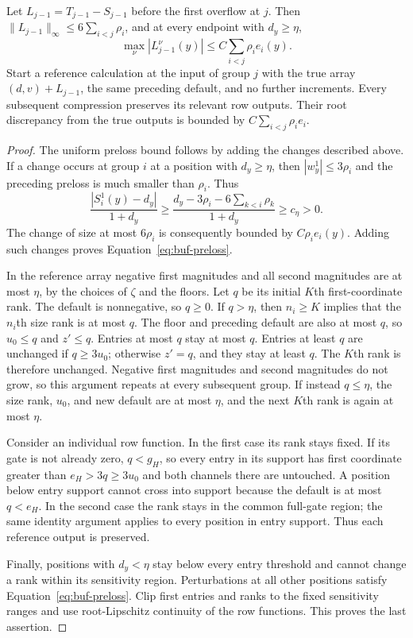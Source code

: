 \begin{lemma}
\label{lem:buf-reference}
Let $L_{j-1}=T_{j-1}-S_{j-1}$ before the first overflow at $j$.
Then $\|L_{j-1}\|_\infty\leq6\sum_{i<j}\rho_i$, and at every endpoint
with $d_y\geq\eta$,
\begin{equation}
 \max_\nu|L_{j-1}^\nu(y)|
       \leq C\sum_{i<j}\rho_i e_i(y).
 \label{eq:buf-preloss}
\end{equation}
Start a reference calculation at the input of group $j$ with the true
array $(d,v)+L_{j-1}$, the same preceding default, and no further
increments.  Every subsequent compression preserves its relevant row
outputs.  Their root discrepancy from the true outputs is bounded by
$C\sum_{i<j}\rho_i e_i$.
\end{lemma}
\begin{proof}
The uniform preloss bound follows by adding the changes described above.
If a change occurs at group $i$ at a position with $d_y\geq\eta$, then
$|w_y^1|\leq3\rho_i$ and the preceding preloss is much smaller than
$\rho_i$.  Thus
\[
 \frac{|S_i^1(y)-d_y|}{1+d_y}
 \geq \frac{d_y-3\rho_i-6\sum_{k<i}\rho_k}{1+d_y}
 \geq c_\eta>0.
\]
The change of size at most $6\rho_i$ is consequently bounded by
$C\rho_i e_i(y)$.  Adding such changes proves
Equation~\eqref{eq:buf-preloss}.

In the reference array negative first magnitudes and all second magnitudes
are at most $\eta$, by the choices of $\zeta$ and the floors.
Let $q$ be its initial $K$th first-coordinate rank.  The default is
nonnegative, so $q\geq0$.  If $q>\eta$, then $n_i\geq K$ implies that the
$n_i$th size rank is at most $q$.  The floor and preceding default are
also at most $q$, so $u_0\leq q$ and $z'\leq q$.  Entries at most $q$
stay at most $q$.  Entries at least $q$ are unchanged if $q\geq3u_0$;
otherwise $z'=q$, and they stay at least $q$.  The $K$th rank is therefore
unchanged.  Negative first magnitudes and second magnitudes do not grow,
so this argument repeats at every subsequent group.  If instead $q\leq\eta$,
the size rank, $u_0$, and new default are at most $\eta$, and the next
$K$th rank is again at most $\eta$.

Consider an individual row function.  In the first case its rank stays
fixed.  If its gate is not already zero, $q<g_H$, so every entry in its
support has first coordinate greater than $e_H>3q\geq3u_0$ and both
channels there are untouched.  A position below entry support cannot
cross into support because the default is at most $q<e_H$.
In the second case the rank stays in the common full-gate region; the
same identity argument applies to every position in entry support.
Thus each reference output is preserved.

Finally, positions with $d_y<\eta$ stay below every entry threshold and
cannot change a rank within its sensitivity region.  Perturbations at
all other positions satisfy Equation~\eqref{eq:buf-preloss}.  Clip first
entries and ranks to the fixed sensitivity ranges and use root-Lipschitz
continuity of the row functions.  This proves the last assertion.
\end{proof}

